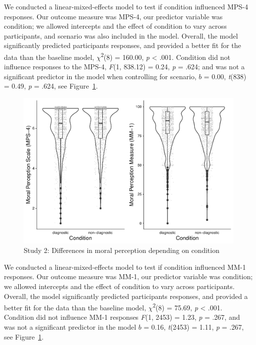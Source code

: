 \documentclass[
  english,
  man,floatsintext]{apa7}
\begin{document}
We conducted a linear-mixed-effects model to test if condition influenced MPS-4 responses. Our outcome measure was MPS-4, our predictor variable was condition; we allowed intercepts and the effect of condition to vary across participants, and scenario was also included in the model.
Overall, the model significantly predicted participants responses, and provided a better fit for the data than the baseline model, \(\chi\)\textsuperscript{2}(8) = 160.00, \emph{p} \textless{} .001. Condition did not influence responses to the MPS-4, \emph{F}(1, 838.12) = 0.24, \emph{p} = .624; and was not a significant predictor in the model when controlling for scenario, \(b\) = 0.00, \emph{t}(838) = 0.49, \emph{p} = .624, see Figure~\ref{fig:S2bothconditionplot}.

\begin{figure}
\centering
\includegraphics{moral_dilution_in_chunks_files/figure-latex/S2bothconditionplot-1.pdf}
\caption{\label{fig:S2bothconditionplot}Study 2: Differences in moral perception depending on condition}
\end{figure}

We conducted a linear-mixed-effects model to test if condition influenced MM-1 responses. Our outcome measure was MM-1, our predictor variable was condition; we allowed intercepts and the effect of condition to vary across participants. Overall, the model significantly predicted participants responses, and provided a better fit for the data than the baseline model, \(\chi\)\textsuperscript{2}(8) = 75.69, \emph{p} \textless{} .001. Condition did not influence MM-1 responses \emph{F}(1, 2453) = 1.23, \emph{p} = .267, and was not a significant predictor in the model \(b\) = 0.16, \emph{t}(2453) = 1.11, \emph{p} = .267, see Figure~\ref{fig:S2bothconditionplot}.
\end{document}
